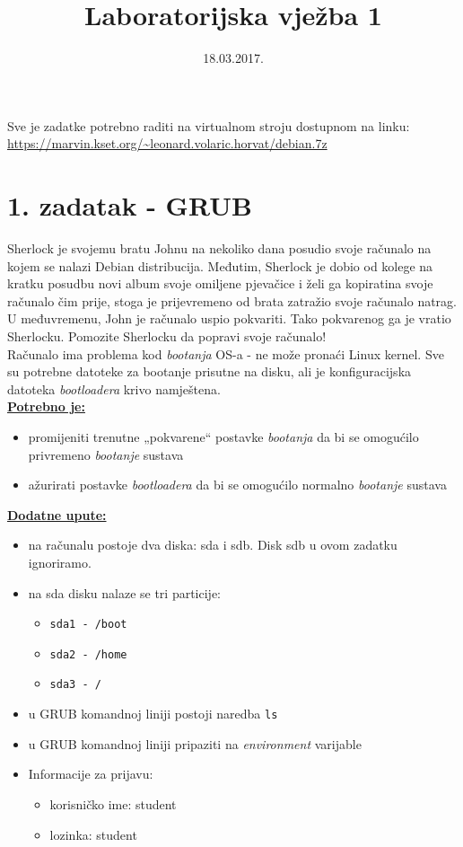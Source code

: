 \documentclass[12pt,a4paper]{article}
\begin{document}
	\title{Laboratorijska vježba 1}
	\date{\vspace{-5ex} 18.03.2017.}
	\maketitle

Sve je zadatke potrebno raditi na virtualnom stroju dostupnom na linku: \url{https://marvin.kset.org/~leonard.volaric.horvat/debian.7z}

\section*{1. zadatak - GRUB}

Sherlock je svojemu bratu Johnu na nekoliko dana posudio svoje računalo na kojem se nalazi Debian distribucija. Međutim, Sherlock je dobio od kolege na kratku posudbu novi album svoje omiljene pjevačice i želi ga kopirati\footnotemark[1] na svoje računalo čim prije, stoga je prijevremeno od brata zatražio svoje računalo natrag. U međuvremenu, John je računalo uspio pokvariti. Tako pokvarenog ga je vratio Sherlocku. Pomozite Sherlocku da popravi svoje računalo! \\

Računalo ima problema kod \textit{bootanja} OS-a - ne može pronaći Linux kernel. Sve su potrebne datoteke za bootanje prisutne na disku, ali je konfiguracijska datoteka \textit{bootloadera} krivo namještena. \\

\underline{\textbf{Potrebno je:}}
\begin{itemize}
	\item promijeniti trenutne „pokvarene“ postavke \textit{bootanja} da bi se omogućilo privremeno \textit{bootanje} sustava
	\item ažurirati postavke \textit{bootloadera} da bi se omogućilo normalno \textit{bootanje} sustava \\
\end{itemize}

\underline{\textbf{Dodatne upute:}}
\begin{itemize}
	\item na računalu postoje dva diska: sda i sdb. Disk sdb u ovom zadatku ignoriramo.
	\item na sda disku nalaze se tri particije:
	\begin{itemize}
		\item \texttt{sda1 - /boot}
		\item \texttt{sda2 - /home}
		\item \texttt{sda3 - /}
	\end{itemize}
	\item u GRUB komandnoj liniji postoji naredba \texttt{ls}
	\item u GRUB komandnoj liniji pripaziti na \textit{environment} varijable
	\item Informacije za prijavu:
	\begin{itemize}
		\item korisničko ime: student
		\item lozinka: student
	\end{itemize}
\end{itemize}
\end{document}
